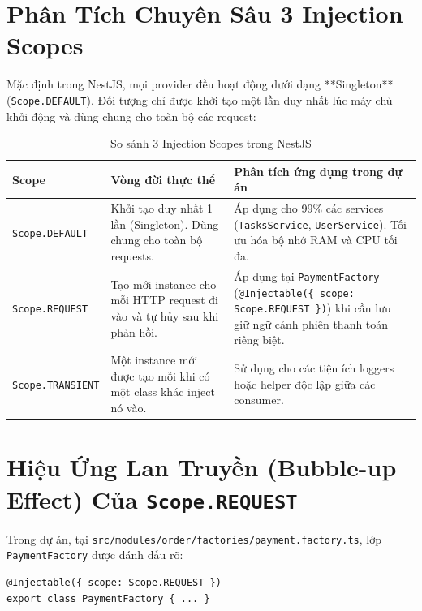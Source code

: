 \documentclass[12pt,a4paper,oneside]{book}
\begin{document}
\section{Phân Tích Chuyên Sâu 3 Injection Scopes}
Mặc định trong NestJS, mọi provider đều hoạt động dưới dạng **Singleton** (\texttt{Scope.DEFAULT}). Đối tượng chỉ được khởi tạo một lần duy nhất lúc máy chủ khởi động và dùng chung cho toàn bộ các request:

\begin{table}[htbp]
  \centering
  \small
  \caption{So sánh 3 Injection Scopes trong NestJS}
  \label{tab:scopes-detailed}
  \begin{tabularx}{\textwidth}{l p{3cm} X}
    \toprule
    \textbf{Scope} & \textbf{Vòng đời thực thể} & \textbf{Phân tích ứng dụng trong dự án} \\
    \midrule
    \texttt{Scope.DEFAULT} & Khởi tạo duy nhất 1 lần (Singleton). Dùng chung cho toàn bộ requests. & Áp dụng cho 99\% các services (\texttt{TasksService}, \texttt{UserService}). Tối ưu hóa bộ nhớ RAM và CPU tối đa. \\
    \texttt{Scope.REQUEST} & Tạo mới instance cho mỗi HTTP request đi vào và tự hủy sau khi phản hồi. & Áp dụng tại \texttt{PaymentFactory} (\texttt{@Injectable(\{ scope: Scope.REQUEST \})}) khi cần lưu giữ ngữ cảnh phiên thanh toán riêng biệt. \\
    \texttt{Scope.TRANSIENT} & Một instance mới được tạo mỗi khi có một class khác inject nó vào. & Sử dụng cho các tiện ích loggers hoặc helper độc lập giữa các consumer. \\
    \bottomrule
  \end{tabularx}
\end{table}

\section{Hiệu Ứng Lan Truyền (Bubble-up Effect) Của \texttt{Scope.REQUEST}}
Trong dự án, tại \texttt{src/modules/order/factories/payment.factory.ts}, lớp \texttt{PaymentFactory} được đánh dấu rõ:
\begin{codebox}
\begin{Verbatim}[fontsize=\small]
@Injectable({ scope: Scope.REQUEST })
export class PaymentFactory { ... }
\end{Verbatim}
\end{codebox}
\end{document}

